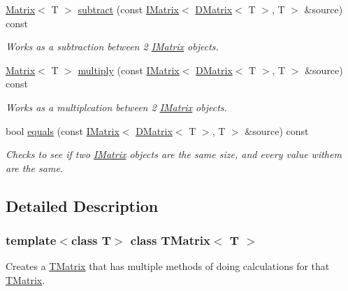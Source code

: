 \begin{DoxyCompactItemize}
\mbox{\hyperlink{class_matrix}{Matrix}}$<$ T $>$ \mbox{\hyperlink{class_t_matrix_aec6418c61539221bb46bc104c6147b24}{subtract}} (const \mbox{\hyperlink{class_i_matrix}{I\+Matrix}}$<$ \mbox{\hyperlink{class_d_matrix}{D\+Matrix}}$<$ T $>$, T $>$ \&source) const
\begin{DoxyCompactList}\small\item\em Works as a subtraction between 2 \mbox{\hyperlink{class_i_matrix}{I\+Matrix}} objects. \end{DoxyCompactList}\item 
\mbox{\hyperlink{class_matrix}{Matrix}}$<$ T $>$ \mbox{\hyperlink{class_t_matrix_a62b64ac4f66c3a029263672f63126665}{multiply}} (const \mbox{\hyperlink{class_i_matrix}{I\+Matrix}}$<$ \mbox{\hyperlink{class_d_matrix}{D\+Matrix}}$<$ T $>$, T $>$ \&source) const
\begin{DoxyCompactList}\small\item\em Works as a multiplcation between 2 \mbox{\hyperlink{class_i_matrix}{I\+Matrix}} objects. \end{DoxyCompactList}\item 
bool \mbox{\hyperlink{class_t_matrix_ab0f81ead2c1dab7c33185f847e59c10a}{equals}} (const \mbox{\hyperlink{class_i_matrix}{I\+Matrix}}$<$ \mbox{\hyperlink{class_d_matrix}{D\+Matrix}}$<$ T $>$, T $>$ \&source) const
\begin{DoxyCompactList}\small\item\em Checks to see if two \mbox{\hyperlink{class_i_matrix}{I\+Matrix}} objects are the same size, and every value withem are the same. \end{DoxyCompactList}\end{DoxyCompactItemize}


\subsection{Detailed Description}
\subsubsection*{template$<$class T$>$\newline
class T\+Matrix$<$ T $>$}

Creates a \mbox{\hyperlink{class_t_matrix}{T\+Matrix}} that has multiple methods of doing calculations for that \mbox{\hyperlink{class_t_matrix}{T\+Matrix}}. 

